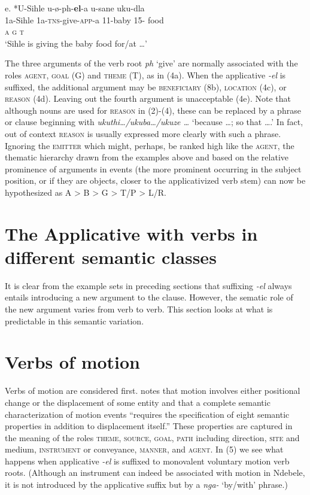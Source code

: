 \gll   e.    *U-Sihle   u-ø-ph-\textbf{el}{}-a        u-sane     uku-dla       \\
         1a-Sihle   1a-\textsc{tns}{}-give-\textsc{app}{}-a   11-baby     15- food   \\
         \textsc{a                  g      t}\\
\glt     ‘Sihle is giving the baby food for/at …’
\z

The three arguments of the verb root \textit{ph} ‘give’ are normally associated with the roles \textsc{agent}, \textsc{goal} (G) and \textsc{theme} (T), as in (4a). When the applicative \textit{{}-el} is suffixed, the additional argument may be \textsc{beneficiary} (8b), \textsc{location} (4c), or \textsc{reason} (4d). Leaving out the fourth argument is unacceptable (4e). Note that although nouns are used for \textsc{reason} in (2)-(4), these can be replaced by a phrase or clause beginning with \textit{ukuthi…/ukuba…/ukuze …} ‘because …; so that ….’ In fact, out of context \textsc{reason} is usually expressed more clearly with such a phrase. Ignoring the \textsc{emitter} which might, perhaps, be ranked high like the \textsc{agent}, the thematic hierarchy drawn from the examples above and based on the relative prominence of arguments in events (the more prominent occurring in the subject position, or if they are objects, closer to the applicativized verb stem) can now be hypothesized as A {\textgreater} B {\textgreater} G {\textgreater} T/P {\textgreater} L/R.  

\section{ The Applicative with verbs in different semantic classes}

It is clear from the example sets in preceding sections that suffixing \textit{{}-el} always entails introducing a new argument to the clause. However, the sematic role of the new argument varies from verb to verb. This section looks at what is predictable in this semantic variation.

\section{Verbs of motion }

Verbs of motion are considered first. \citet[171]{Frawley1992} notes that motion involves either positional change or the displacement of some entity and that a complete semantic characterization of motion events “requires the specification of eight semantic properties in addition to displacement itself.” These properties are captured in the meaning of the roles \textsc{theme}, \textsc{source}, \textsc{goal}, \textsc{path} including direction, \textsc{site} and medium, \textsc{instrument} or conveyance, \textsc{manner}, and \textsc{agent}. In (5) we see what happens when applicative \textit{{}-el} is suffixed to monovalent voluntary motion verb roots. (Although an instrument can indeed be associated with motion in Ndebele, it is not introduced by the applicative suffix but by a \textit{nga-} ‘by/with’ phrase.)

